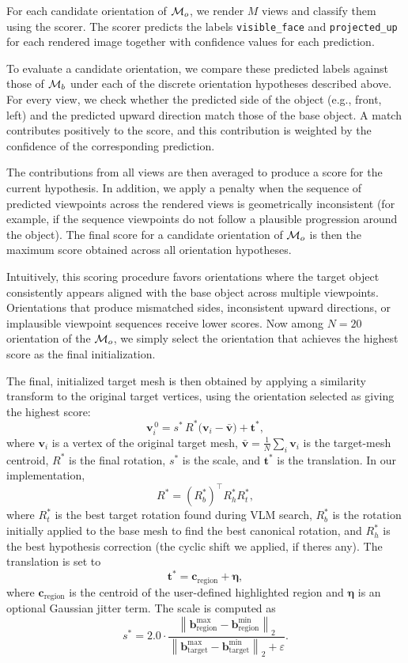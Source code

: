 For each candidate orientation of $\mathcal{M}_o$, we render $M$ views and classify them using the scorer. The scorer predicts the labels \texttt{visible\_face} and \texttt{projected\_up} for each rendered image together with confidence values for each prediction.

To evaluate a candidate orientation, we compare these predicted labels against those of $\mathcal{M}_b$ under each of the discrete orientation hypotheses described above. For every view, we check whether the predicted side of the object (e.g., front, left) and the predicted upward direction match those of the base object. A match contributes positively to the score, and this contribution is weighted by the confidence of the corresponding prediction.

The contributions from all views are then averaged to produce a score for the current hypothesis. In addition, we apply a penalty when the sequence of predicted viewpoints across the rendered views is geometrically inconsistent (for example, if the sequence viewpoints do not follow a plausible progression around the object). The final score for a candidate orientation of $\mathcal{M}_o$ is then the maximum score obtained across all orientation hypotheses.

Intuitively, this scoring procedure favors orientations where the target object consistently appears aligned with the base object across multiple viewpoints. Orientations that produce mismatched sides, inconsistent upward directions, or implausible viewpoint sequences receive lower scores. Now among $N=20$ orientation of the $\mathcal{M}_o$, we simply select the orientation that achieves the highest score as the final initialization.

The final, initialized target mesh is then obtained by applying a similarity transform to the original target vertices, using the orientation selected as giving the highest score:
\[
\mathbf{v}_i^{\,0}
=
s^* \, R^* \bigl(\mathbf{v}_i - \bar{\mathbf{v}}\bigr) + \mathbf{t}^* ,
\]
where \(\mathbf{v}_i\) is a vertex of the original target mesh, \(\bar{\mathbf{v}}=\frac{1}{N}\sum_i \mathbf{v}_i\) is the target-mesh centroid, \(R^*\) is the final rotation, \(s^*\) is the scale, and \(\mathbf{t}^*\) is the translation. In our implementation,
\[
R^* = (R_b^*)^\top R_h^* R_t^*,
\]
where \(R_t^*\) is the best target rotation found during VLM search, \(R_b^*\) is the rotation initially applied to the base mesh to find the best canonical rotation, and \(R_h^*\) is the best hypothesis correction (the cyclic shift we applied, if theres any). The translation is set to
\[
\mathbf{t}^* = \mathbf{c}_{\text{region}} + \boldsymbol{\eta},
\]
where \(\mathbf{c}_{\text{region}}\) is the centroid of the user-defined highlighted region and \(\boldsymbol{\eta}\) is an optional Gaussian jitter term. The scale is computed as
\[
s^* = 2.0 \cdot
\frac{\left\|\mathbf{b}^{\max}_{\text{region}}-\mathbf{b}^{\min}_{\text{region}}\right\|_2}
{\left\|\mathbf{b}^{\max}_{\text{target}}-\mathbf{b}^{\min}_{\text{target}}\right\|_2+\varepsilon}.
\]

